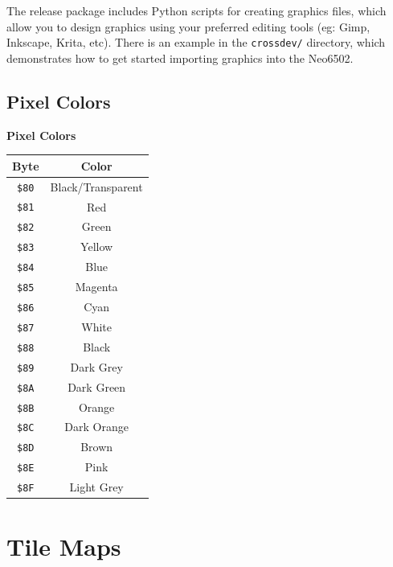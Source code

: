 \documentclass[12pt]{article}
\newcommand{\MonoSp}[1] {\fontsize{10pt}{10pt}\selectfont\texttt{#1}\normalsize}
\begin{document}
The release package includes Python scripts for creating graphics files,
which allow you to design graphics using your preferred editing tools
(eg: Gimp, Inkscape, Krita, etc).
There is an example in the \MonoSp{crossdev/} directory,
which demonstrates how to get started importing graphics into the Neo6502.


\pagebreak


\subsection{Pixel Colors}\label{subsec:graphics-colors}

\begin{table}[h]
\centering\textbf{Pixel Colors}   \\
\begin{tabular}{ | c | c | }         \hline
\textbf{Byte} & \textbf{Color}    \\ \hline
\MonoSp{\$80} & Black/Transparent \\ \hline
\MonoSp{\$81} & Red               \\ \hline
\MonoSp{\$82} & Green             \\ \hline
\MonoSp{\$83} & Yellow            \\ \hline
\MonoSp{\$84} & Blue              \\ \hline
\MonoSp{\$85} & Magenta           \\ \hline
\MonoSp{\$86} & Cyan              \\ \hline
\MonoSp{\$87} & White             \\ \hline
\MonoSp{\$88} & Black             \\ \hline
\MonoSp{\$89} & Dark Grey         \\ \hline
\MonoSp{\$8A} & Dark Green        \\ \hline
\MonoSp{\$8B} & Orange            \\ \hline
\MonoSp{\$8C} & Dark Orange       \\ \hline
\MonoSp{\$8D} & Brown             \\ \hline
\MonoSp{\$8E} & Pink              \\ \hline
\MonoSp{\$8F} & Light Grey        \\ \hline
\end{tabular}
\end{table}


\pagebreak


\section{Tile Maps}\label{tilemaps}
\end{document}
